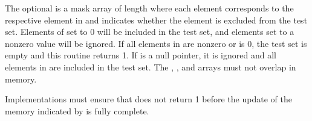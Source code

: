\begin{apidefinition}
{    The optional  is a mask array of length  where each element
    corresponds to the respective element in  and indicates whether
    the element is excluded from the test set.  Elements of  set to
    0 will be included in the test set, and elements set to a nonzero value will be ignored.  If all elements
    in  are nonzero or  is 0, the test set is empty
    and this routine returns 1.  If  is a null pointer, it is
    ignored and all elements in  are included in the test set.  The
    , , and  arrays must not overlap in
    memory.

    Implementations must ensure that  does not
    return 1 before the update of the memory indicated by  is fully
    complete.
}


\end{apidefinition}
